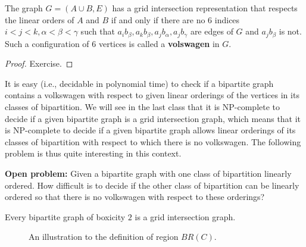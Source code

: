 \begin{thm}
	The graph $G = (A \cup B, E)$ has a grid intersection representation that respects the linear orders of $A$ and $B$ if and only if there are no 6 indices $i < j < k, \alpha < \beta < \gamma$ such that $a_i b_\beta , a_k b_\beta , a_j b_\alpha , a_j b_\gamma$ are edges of $G$ and $a_j b_\beta$ is not. Such a configuration of 6 vertices is called a \textbf{volswagen} in $G$.
	\label{thm-5}
\end{thm}

\begin{proof}
	Exercise.
\end{proof}

It is easy (i.e., decidable in polynomial time) to check if a bipartite graph contains a volkswagen with respect to given linear orderings of the vertices in its classes of bipartition. We will see in the last class that it is NP-complete to decide if a given bipartite graph is a grid intersection graph, which means that it is NP-complete to decide if a given bipartite graph allows linear orderings of its classes of bipartition with respect to which there is no volkswagen. The following problem is thus quite interesting in this context.

\textbf{Open problem:} Given a bipartite graph with one class of bipartition linearly ordered. How difficult is to decide if the other class of bipartition can be linearly ordered so that there is no volkswagen with respect to these orderings?

\begin{thm}
	Every bipartite graph of boxicity $2$ is a grid intersection graph.
\end{thm}

\begin{figure}[!ht]\centering
	\caption{An illustration to the definition of region $BR(C)$.}
\end{figure}

